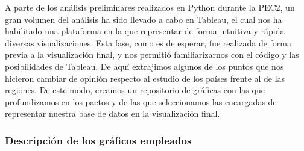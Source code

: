 \documentclass[11pt]{article}
\begin{document}
A parte de los análisis preliminares realizados en Python durante la PEC2, un gran volumen del análisis ha sido llevado a cabo en Tableau, el cual nos ha habilitado una plataforma en la que representar de forma intuitiva y rápida diversas visualizaciones. Esta fase, como es de esperar, fue realizada de forma previa a la visualización final, y nos permitió familiarizarnos con el código y las posibilidades de Tableau. De aquí extrajimos algunos de los puntos que nos hicieron cambiar de opinión respecto al estudio de los países frente al de las regiones. De este modo, creamos un repositorio de gráficas con las que profundizamos en los pactos y de las que seleccionamos las encargadas de representar nuestra base de datos en la visualización final.

\subsubsection{Descripción de los gráficos empleados}
\end{document}
